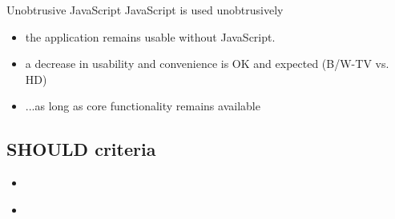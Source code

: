 \documentclass{beamer}
\begin{document}
\begin{frame}{Unobtrusive JavaScript}
  JavaScript is used unobtrusively

  \begin{itemize}
    \item the application remains usable without JavaScript.
    \item a decrease in usability and convenience is OK and expected (B/W-TV vs. HD)
    \item ...as long as core functionality remains available
  \end{itemize}
\end{frame}

\subsection{SHOULD criteria}

\begin{frame}{}

  \begin{itemize}
    \item
  \end{itemize}
\end{frame}

\begin{frame}{}
  \begin{itemize}
    \item
  \end{itemize}
\end{frame}



\end{document}
